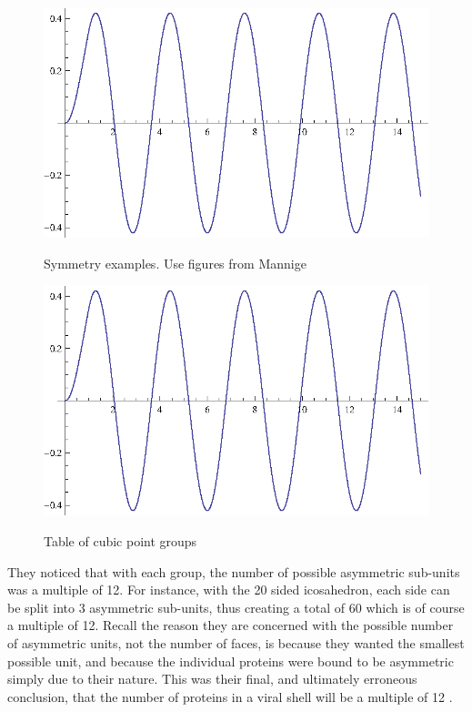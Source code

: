\documentclass[12pt,letter]{article}
\begin{document}
\begin{figure}[h]
	\caption{Symmetry examples. Use figures from Mannige}
	\centering
	\includegraphics{place_holder.eps}
	\label{fig:reflect}
\end{figure}

\begin{figure}[h]
	\caption{Table of cubic point groups}
	\centering
	\includegraphics{place_holder.eps}
	\label{table:cubic_groups}
\end{figure}

They noticed that with each group, the number of possible asymmetric sub-units was a multiple of 12. For instance, with the 20 sided icosahedron, each side can be split into 3 asymmetric sub-units, thus creating a total of 60 which is of course a multiple of 12. Recall the reason they are concerned with the possible number of asymmetric units, not the number of faces, is because they wanted the smallest possible unit, and because the individual proteins were bound to be asymmetric simply due to their nature. This was their final, and ultimately erroneous conclusion, that the number of proteins in a viral shell will be a multiple of 12 \cite[p 475]{Crick:1956}.
\end{document}
